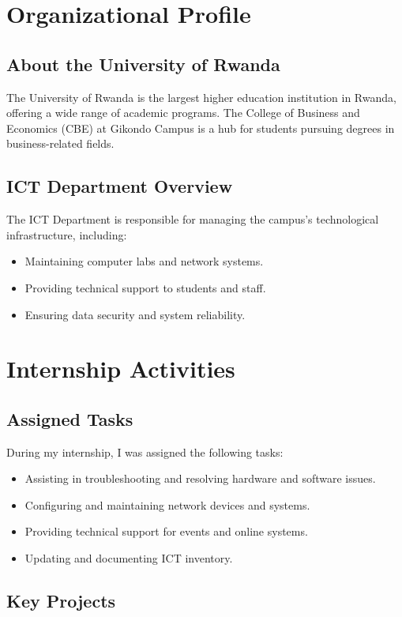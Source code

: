 \documentclass[a4paper,12pt]{report}
\begin{document}
\chapter{Organizational Profile}
\section{About the University of Rwanda}
The University of Rwanda is the largest higher education institution in Rwanda, offering a wide range of academic programs. The College of Business and Economics (CBE) at Gikondo Campus is a hub for students pursuing degrees in business-related fields.

\section{ICT Department Overview}
The ICT Department is responsible for managing the campus’s technological infrastructure, including:
\begin{itemize}
\item Maintaining computer labs and network systems.
\item Providing technical support to students and staff.
\item Ensuring data security and system reliability.
\end{itemize}

\chapter{Internship Activities}
\section{Assigned Tasks}
During my internship, I was assigned the following tasks:
\begin{itemize}
\item Assisting in troubleshooting and resolving hardware and software issues.
\item Configuring and maintaining network devices and systems.
\item Providing technical support for events and online systems.
\item Updating and documenting ICT inventory.
\end{itemize}

\section{Key Projects}
\end{document}
